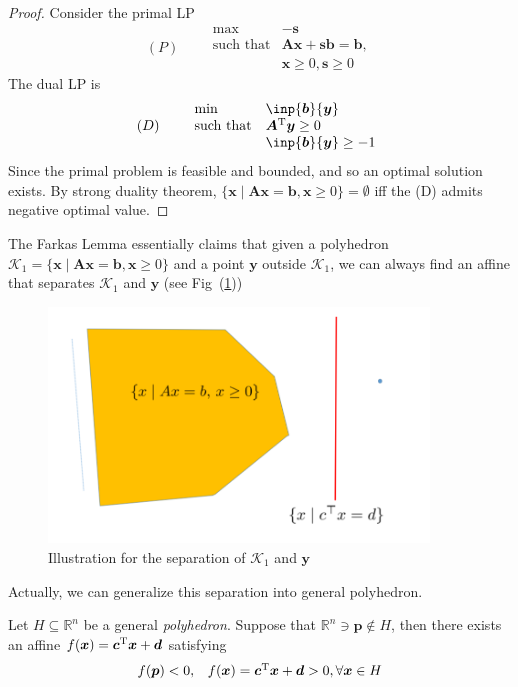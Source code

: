 \begin{proof}
Consider the primal LP
\[
(P)\qquad
\begin{array}{ll}
\max&-\bm s\\
\mbox{such that}&\bm A\bm x+\bm s\bm b=\bm b,\\
&\bm x\ge0,\bm s\ge0
\end{array}
\]
The dual LP is
\[
(D)\qquad
\begin{array}{ll}
\min&\inp{\bm b}{\bm y}\\
\mbox{such that}&\bm A\trans\bm y\ge0\\
&\inp{\bm b}{\bm y}\ge-1 
\end{array}
\]
Since the primal problem is feasible and bounded, and so an optimal solution exists.
By strong duality theorem, $\{\bm x\mid\bm A\bm x=\bm b,\bm x\ge0\}=\emptyset$ iff the (D) admits negative optimal value. 
\end{proof}

\begin{remark}
The Farkas Lemma essentially claims that given a polyhedron $\mathcal{K}_1=\{\bm x\mid\bm A\bm x=\bm b,\bm x\ge0\}$ and a point $\bm y$ outside $\mathcal{K}_1$, we can always find an affine that separates $\mathcal{K}_1$ and $\bm y$ (see Fig~(\ref{fig:2:9}))
\begin{figure}
\centering
\includegraphics[width=0.9\textwidth]{Second_lecture/p_9}
\caption{Illustration for the separation of $\mathcal{K}_1$ and $\bm y$}
\label{fig:2:9}
\end{figure}

Actually, we can generalize this separation into general polyhedron.
\end{remark}
\begin{theorem}
Let $H\subseteq\mathbb{R}^n$ be a general \emph{polyhedron}. Suppose that $\mathbb{R}^n\ni \bm p\notin H$, then there exists an affine $f(\bm x)=\bm c^{\mathrm T}\bm x+\bm d$ satisfying
\[
\begin{array}{ll}
f(\bm p)<0,&
f(\bm x)=\bm c^{\mathrm T}\bm x+\bm d>0,\forall\bm x\in H
\end{array}
\]
\end{theorem}

